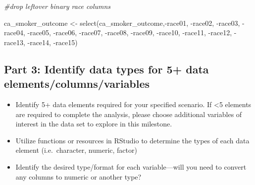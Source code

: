 \documentclass[
]{article}
\newenvironment{Shaded}{\begin{snugshade}}{\end{snugshade}}
\newcommand{\CommentTok}[1]{\textcolor[rgb]{0.56,0.35,0.01}{\textit{#1}}}
\newcommand{\FunctionTok}[1]{\textcolor[rgb]{0.00,0.00,0.00}{#1}}
\newcommand{\NormalTok}[1]{#1}
\newcommand{\OtherTok}[1]{\textcolor[rgb]{0.56,0.35,0.01}{#1}}
\newcommand{\SpecialCharTok}[1]{\textcolor[rgb]{0.00,0.00,0.00}{#1}}
\providecommand{\tightlist}{%
  \setlength{\itemsep}{0pt}\setlength{\parskip}{0pt}}
\begin{document}
\begin{Shaded}
\begin{Highlighting}[]
\CommentTok{\#drop leftover binary race columns }

\NormalTok{ca\_smoker\_outcome }\OtherTok{\textless{}{-}} \FunctionTok{select}\NormalTok{(ca\_smoker\_outcome,}\SpecialCharTok{{-}}\NormalTok{race01,}
                                 \SpecialCharTok{{-}}\NormalTok{race02,}
                                 \SpecialCharTok{{-}}\NormalTok{race03,}
                                 \SpecialCharTok{{-}}\NormalTok{race04,}
                                 \SpecialCharTok{{-}}\NormalTok{race05,}
                                 \SpecialCharTok{{-}}\NormalTok{race06,}
                                 \SpecialCharTok{{-}}\NormalTok{race07,}
                                 \SpecialCharTok{{-}}\NormalTok{race08,}
                                 \SpecialCharTok{{-}}\NormalTok{race09,}
                                 \SpecialCharTok{{-}}\NormalTok{race10,}
                                 \SpecialCharTok{{-}}\NormalTok{race11,}
                                 \SpecialCharTok{{-}}\NormalTok{race12,}
                                 \SpecialCharTok{{-}}\NormalTok{race13,}
                                 \SpecialCharTok{{-}}\NormalTok{race14,}
                                 \SpecialCharTok{{-}}\NormalTok{race15)}
\end{Highlighting}
\end{Shaded}

\newpage

\hypertarget{part-3-identify-data-types-for-5-data-elementscolumnsvariables}{%
\subsection{\texorpdfstring{Part 3: Identify data types for 5+ data
elements/columns/variables
\n}{Part 3: Identify data types for 5+ data elements/columns/variables }}\label{part-3-identify-data-types-for-5-data-elementscolumnsvariables}}

\begin{itemize}
\tightlist
\item
  Identify 5+ data elements required for your specified scenario. If
  \textless5 elements are required to complete the analysis, please
  choose additional variables of interest in the data set to explore in
  this milestone. \n
\item
  Utilize functions or resources in RStudio to determine the types of
  each data element (i.e.~character, numeric, factor) \n
\item
  Identify the desired type/format for each variable---will you need to
  convert any columns to numeric or another type? \n
\end{itemize}
\end{document}
